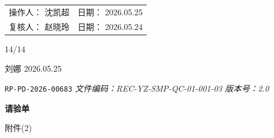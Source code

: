\documentclass[UTF8,10pt,a4paper,fontset=fandol]{ctexart}
\newcommand{\fieldvalue}[1]{#1}
\newcommand{\handwritten}[1]{#1}
\begin{document}
\noindent
\begin{tabularx}{\textwidth}{@{}X X@{}}
操作人：
\fieldvalue{\handwritten{沈凯超}}
&
日期：
\fieldvalue{\handwritten{2026.05.25}}
\\[0.35em]
复核人：
\fieldvalue{\handwritten{赵晓玲}}
&
日期：
\fieldvalue{\handwritten{2026.05.24}}
\end{tabularx}

\bigskip

\begin{flushright}
\handwritten{14/14}

\medskip

\handwritten{刘娜 2026.05.25}
\end{flushright}

\newpage

\noindent\texttt{RP-PD-2026-00683}\hfill
\textit{文件编码：REC-YZ-SMP-QC-01-001-03 \quad 版本号：2.0}

\begin{center}
\textbf{请验单}
\end{center}

\noindent\hfill\handwritten{附件(2)}
\end{document}
